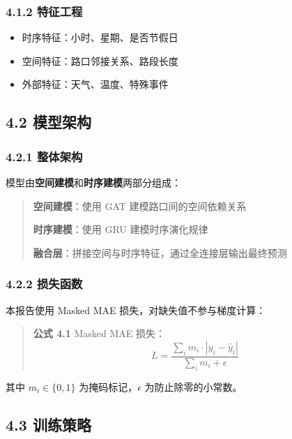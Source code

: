 \documentclass{harryopo-mathnotes}
\begin{document}
\subsubsection{4.1.2 特征工程}\label{ux7279ux5f81ux5de5ux7a0b}

\begin{itemize}
\tightlist
\item
  时序特征：小时、星期、是否节假日
\item
  空间特征：路口邻接关系、路段长度
\item
  外部特征：天气、温度、特殊事件
\end{itemize}

\subsection{4.2 模型架构}\label{ux6a21ux578bux67b6ux6784}

\subsubsection{4.2.1 整体架构}\label{ux6574ux4f53ux67b6ux6784}

模型由\textbf{空间建模}和\textbf{时序建模}两部分组成：

\begin{quote}
\textbf{空间建模}：使用 GAT 建模路口间的空间依赖关系

\textbf{时序建模}：使用 GRU 建模时序演化规律

\textbf{融合层}：拼接空间与时序特征，通过全连接层输出最终预测
\end{quote}

\subsubsection{4.2.2 损失函数}\label{ux635fux5931ux51fdux6570}

本报告使用 Masked MAE 损失，对缺失值不参与梯度计算：

\begin{quote}
\textbf{公式 4.1} Masked MAE 损失：
\[L = \frac{\sum_{i} m_i \cdot |y_i - \hat{y}_i|}{\sum_{i} m_i + \epsilon}\]
\end{quote}

其中 \(m_i \in \{0, 1\}\) 为掩码标记，\(\epsilon\) 为防止除零的小常数。

\subsection{4.3 训练策略}\label{ux8badux7ec3ux7b56ux7565}
\end{document}
